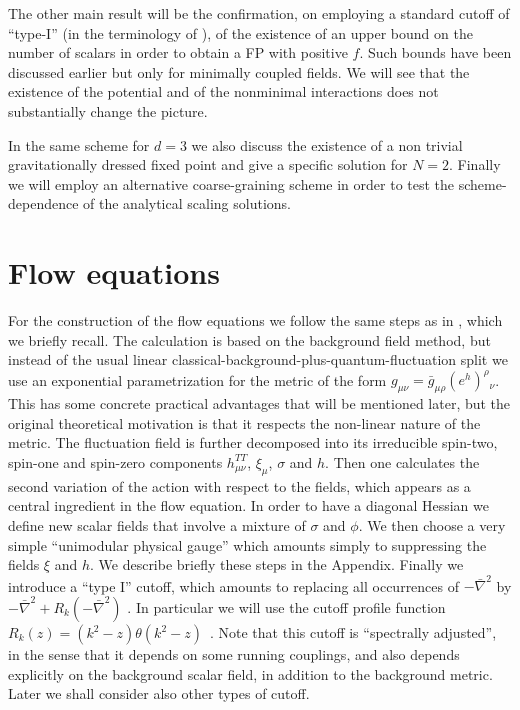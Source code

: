 \documentclass[11pt]{book} %
\newcommand{\bnabla}{\bar\nabla}
\begin{document}
The other main result will be the confirmation,
on employing a standard cutoff of ``type-I''
(in the terminology of \cite{cpr2}),
of the existence  of an upper bound on the number of scalars in order to obtain a FP with positive $f$.
Such bounds have been discussed earlier but only for minimally
coupled fields.
We will see that the existence of the potential and of the nonminimal interactions does not substantially change the picture.

In the same scheme for $d=3$ we also discuss the existence
of a non trivial gravitationally dressed fixed point
and give a specific solution for $N=2$.
Finally we will employ an alternative coarse-graining scheme
in order to test the scheme-dependence of the analytical scaling solutions.


\section{Flow equations}

For the construction of the flow equations we follow the same steps
as in \cite{pv1}, which we briefly recall.
The calculation is based on the background field method,
but instead of the usual linear classical-background-plus-quantum-fluctuation split we use an exponential parametrization
for the metric of the form
$g_{\mu\nu}=\bar g_{\mu\rho}(e^h)^\rho{}_\nu$.
This has some concrete practical advantages that will be
mentioned later,
but the original theoretical motivation is that it
respects the non-linear nature of the metric.
The fluctuation field is further decomposed into its irreducible
spin-two, spin-one and spin-zero components $h_{\mu\nu}^{TT}$,
$\xi_\mu$, $\sigma$ and $h$.
Then one calculates the second variation of the action with
respect to the fields, which appears as a central ingredient
in the flow equation.
In order to have a diagonal Hessian we define new scalar fields
that involve a mixture of $\sigma$ and $\phi$.
We then choose a very simple ``unimodular physical gauge''
which amounts simply to suppressing the fields $\xi$ and $h$.
We describe briefly these steps in the Appendix.
Finally we introduce a ``type I'' cutoff, which amounts to replacing
all occurrences of $-\bnabla^2$ by $-\bnabla^2+R_k(-\bnabla^2)$
\cite{cpr2}.
In particular we will use the cutoff profile function
$R_k(z)=\left(k^2-z\right)\theta\left(k^2-z\right)$~\cite{Litim}.
Note that this cutoff is ``spectrally adjusted'',
in the sense that it depends on some running couplings,
and also depends explicitly on the background scalar field,
in addition to the background metric.
Later we shall consider also other types of cutoff.
\end{document}
